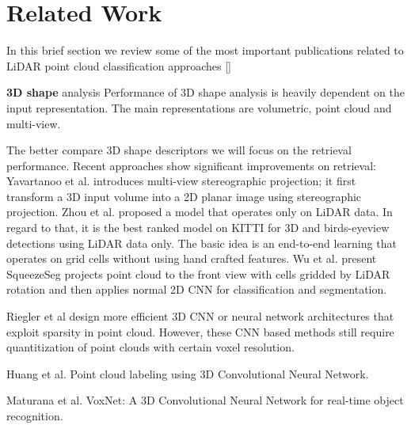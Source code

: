 \section{Related Work}\label{sec:relatedWork}

In this brief section we review some of the most important publications related to LiDAR point cloud classification approaches []

\textbf{3D shape} analysis Performance of 3D shape analysis is heavily dependent on the input representation. The main representations are volumetric, point cloud and multi-view.

The better compare 3D shape descriptors we will focus on the retrieval performance. Recent approaches show significant improvements on retrieval: Yavartanoo et al. \cite{DBLP:journals/corr/abs-1811-01571} introduces multi-view stereographic projection; it first transform a 3D input volume into a 2D planar image using stereographic projection.
Zhou et al. \cite{Zhou_2018_CVPR} proposed a model that operates only on LiDAR data. In regard to that, it is the best ranked model on KITTI \cite{geiger2012we} for 3D and birds-eyeview detections using LiDAR data only. The basic idea is an end-to-end learning that operates on grid cells without using hand crafted features.
Wu et al. \cite{DBLP:conf/icra/WuWYK18} present SqueezeSeg projects point cloud to the front view with cells gridded by LiDAR rotation and then applies normal 2D CNN
for classification and segmentation. 

Riegler et al \cite{DBLP:conf/cvpr/RieglerUG17} design more efficient 3D CNN or neural network architectures that exploit sparsity in point cloud. However,
these CNN based methods still require quantitization of point clouds with certain voxel resolution.








 

Huang et al. \cite{DBLP:conf/icpr/HuangY16}  Point cloud labeling using 3D Convolutional Neural Network. 


Maturana et al. \cite{DBLP:conf/iros/MaturanaS15}  VoxNet: {A} 3D Convolutional Neural Network for real-time object recognition.




